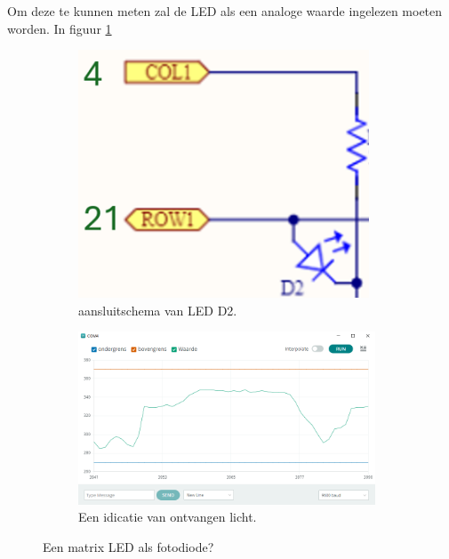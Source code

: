 \begin{enumerate}
	Om deze te kunnen meten zal de LED als een analoge waarde ingelezen moeten worden. 
	In figuur \ref{fig:ledD2} 

	\begin{figure}[h!]
		\centering
		
		\begin{subfigure}[b]{0.30\textwidth}
			\includegraphics[width=0.95\textwidth]{figuren/ledD2}
			\caption{aansluitschema van LED D2. }
			\label{fig:ledD2}
		\end{subfigure}
		\begin{subfigure}[b]{0.69\textwidth}
			\includegraphics[width=0.97\textwidth]{figuren/plotled}
			\caption{Een idicatie van ontvangen licht. }
			\label{fig:plotLog}
			
		\end{subfigure}		
		\captionsetup{justification=centering}
		\caption{Een matrix LED als fotodiode?  }
		\label{fig:Logo}
	

\end{figure}
\end{enumerate}
